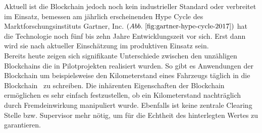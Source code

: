 Aktuell ist die Blockchain jedoch noch kein industrieller Standard oder verbreitet im Einsatz, bemessen am jährlich erscheinenden Hype Cycle des Marktforschungsinstituts Gartner, Inc. $( Abb.~ \ref{fig:gartner-hype-cycle-2017} )$ hat die Technologie noch fünf bis zehn Jahre Entwicklungszeit vor sich. Erst dann wird sie nach aktueller Einschätzung im produktiven Einsatz sein.\\

Bereits heute zeigen sich signifikante Unterschiede zwischen den unzähligen Blockchains die in Pilotprojekten realisiert wurden. So gibt es Anwendungen der Blockchain um beispielsweise den Kilometerstand eines Fahrzeugs täglich \glqq in die Blockchain\grqq~ zu schreiben. Die inhärenten Eigenschaften der Blockchain ermöglichen es sehr einfach festzustellen, ob ein Kilometerstand nachträglich durch Fremdeinwirkung manipuliert wurde. Ebenfalls ist keine zentrale \glqq Clearing Stelle\grqq{} bzw. Supervisor mehr nötig, um für die Echtheit des hinterlegten Wertes zu garantieren. \citep{carVertical}\\




